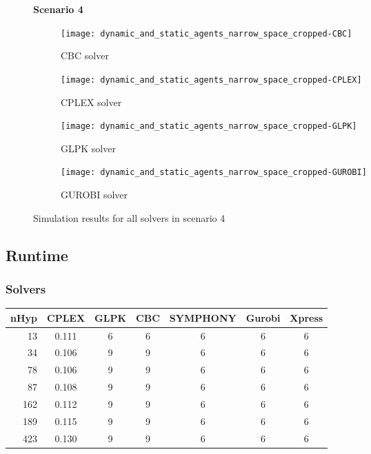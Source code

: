 \begin{figure}[H]
    \centering
    \textbf{Scenario 4}\par \medskip
    \begin{subfigure}{0.49\textwidth}
        \centering
        \texttt{[image: dynamic\_and\_static\_agents\_narrow\_space\_cropped-CBC]}
        \caption{CBC solver}
    \end{subfigure}
    \begin{subfigure}{0.49\textwidth}
        \centering
        \texttt{[image: dynamic\_and\_static\_agents\_narrow\_space\_cropped-CPLEX]}
        \caption{CPLEX solver}
    \end{subfigure}
    \begin{subfigure}{0.49\textwidth}
        \centering
        \texttt{[image: dynamic\_and\_static\_agents\_narrow\_space\_cropped-GLPK]}
        \caption{GLPK solver}
    \end{subfigure}
    \begin{subfigure}{0.49\textwidth}
        \centering
        \texttt{[image: dynamic\_and\_static\_agents\_narrow\_space\_cropped-GUROBI]}
        \caption{GUROBI solver}
    \end{subfigure}
	\label{fig:dynamic_and_static_agents_narrow_space_cropped}
	\caption{Simulation results for all solvers in scenario 4}
\end{figure}


\subsection{Runtime}
\subsubsection{Solvers}

\begin{tabular}{ r c c c c c c}
nHyp 	& CPLEX & GLPK 	& CBC	& SYMPHONY	& Gurobi	& Xpress	\\ \hline
13 		& 0.111	& 6 	& 6		& 6			& 6			& 6			\\
34 		& 0.106	& 9		& 9		& 6			& 6			& 6			\\
78 		& 0.106	& 9		& 9		& 6			& 6			& 6			\\
87 		& 0.108	& 9		& 9		& 6			& 6			& 6			\\
162 	& 0.112	& 9		& 9		& 6			& 6			& 6			\\
189 	& 0.115	& 9		& 9		& 6			& 6			& 6			\\
423 	& 0.130	& 9		& 9		& 6			& 6			& 6			\\
\end{tabular}